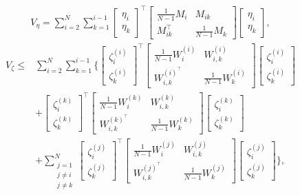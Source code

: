 \documentclass{ifacconf}
\begin{document}
\begin{equation}
        \begin{aligned}
            V_{\eta}=\sum^N_{i=2}\sum^{i-1}_{k=1}\begin{bmatrix}
            \eta_i\\\eta_k
        \end{bmatrix}^\top\begin{bmatrix}
            \frac{1}{N-1}M_i&M_{ik}\\ M_{ik}^\top&\frac{1}{N-1}M_{k}
        \end{bmatrix}\begin{bmatrix}
            \eta_i\\\eta_k
        \end{bmatrix},
        \end{aligned}\label{eq:quadratic form_eta}
\end{equation}
\begin{align}
    V_\zeta\le&\sum^N_{i=2}\sum^{i-1}_{k=1}\Bigg\{\begin{bmatrix}
            \zeta^{(i)}_i\\\zeta_k^{(i)}
        \end{bmatrix}^\top\begin{bmatrix}
            \frac{1}{N-1}W_i^{(i)}&W_{i,k}^{(i)}\\W_{i,k}^{(i)^\top}&\frac{1}{N-1}W_k^{(i)}
        \end{bmatrix}\begin{bmatrix}
            \zeta^{(i)}_i\\\zeta_k^{(i)}
        \end{bmatrix}       \nonumber\\
        &+\begin{bmatrix}
            \zeta^{(k)}_i\\\zeta_k^{(k)}
        \end{bmatrix}^\top\begin{bmatrix}
            \frac{1}{N-1}W_i^{(k)}&W_{i,k}^{(k)}\\W_{i,k}^{(k)^\top}&\frac{1}{N-1}W_k^{(k)}
        \end{bmatrix}\begin{bmatrix}
            \zeta^{(k)}_i\\\zeta_k^{(k)}
        \end{bmatrix}       \label{eq:quadratic form_zeta}\\
        &+\sum^{N}_{\substack{j=1\\j\ne i\\j\ne k}}\begin{bmatrix}
            \zeta^{(j)}_i\\\zeta_k^{(j)}
        \end{bmatrix}^\top\begin{bmatrix}
            \frac{1}{N-1}W_i^{(j)}&W_{i,k}^{(j)}\\W_{i,k}^{(j)^\top}&\frac{1}{N-1}W_k^{(j)}
        \end{bmatrix}\begin{bmatrix}
            \zeta^{(j)}_i\\\zeta_k^{(j)}
        \end{bmatrix}\Bigg\}    \nonumber,
\end{align}
\end{document}
